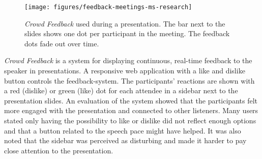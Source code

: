 \begin{figure}
  \texttt{[image: figures/feedback-meetings-ms-research]}
  \caption{\emph{Crowd Feedback} \cite{Teevan:MobileFeedbackDuringPresentation} used during a presentation. The bar next to the slides shows one dot per participant in the meeting. The feedback dots fade out over time.}
  \label{fig:crowd-feedback}
\end{figure}

\emph{Crowd Feedback} \cite{Teevan:MobileFeedbackDuringPresentation} is a system for displaying continuous, real-time feedback to the speaker in presentations. A responsive web application with a like and dislike button controls the feedback-system. The participants' reactions are shown with a red (dislike) or green (like) dot for each attendee in a sidebar next to the presentation slides. An evaluation of the system showed that the participants felt more engaged with the presentation and connected to other listeners. Many users stated only having the possibility to like or dislike did not reflect enough options and that a button related to the speech pace might have helped. It was also noted that the sidebar was perceived as disturbing and made it harder to pay close attention to the presentation.

